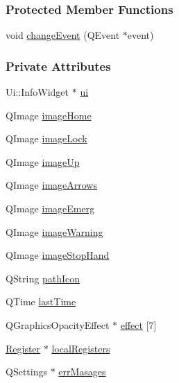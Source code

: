 \subsubsection*{Protected Member Functions}
\begin{DoxyCompactItemize}
\item 
void \mbox{\hyperlink{classInfoWidget_ab9215d8a0db2c91c669dba5e67e27f54}{change\+Event}} (Q\+Event $\ast$event)
\end{DoxyCompactItemize}
\subsubsection*{Private Attributes}
\begin{DoxyCompactItemize}
\item 
Ui\+::\+Info\+Widget $\ast$ \mbox{\hyperlink{classInfoWidget_aac7bf6194c8940ae8bfe6c58ac8a0a43}{ui}}
\item 
Q\+Image \mbox{\hyperlink{classInfoWidget_a0d4c516216ba3df3003c72eec8bf929b}{image\+Home}}
\item 
Q\+Image \mbox{\hyperlink{classInfoWidget_acc842dfe6d29575f2ddbd89cb48f3853}{image\+Lock}}
\item 
Q\+Image \mbox{\hyperlink{classInfoWidget_aff1ea16a7e3fffe12b6bf53ab8ab2df6}{image\+Up}}
\item 
Q\+Image \mbox{\hyperlink{classInfoWidget_a8958069e6c72dde19d74070b0b565d4c}{image\+Arrows}}
\item 
Q\+Image \mbox{\hyperlink{classInfoWidget_a6ca240f5f640fd0ea85e47e9e5d75803}{image\+Emerg}}
\item 
Q\+Image \mbox{\hyperlink{classInfoWidget_abaf1390d58dee5c66125dc58e2aee303}{image\+Warning}}
\item 
Q\+Image \mbox{\hyperlink{classInfoWidget_a0e0b5db9d429867826f370f2a24144da}{image\+Stop\+Hand}}
\item 
Q\+String \mbox{\hyperlink{classInfoWidget_ae0bf133d0a2f93b0536a47fcdad1fbe7}{path\+Icon}}
\item 
Q\+Time \mbox{\hyperlink{classInfoWidget_a2caf54e74e7a24fc5c51ba9c233bce2a}{last\+Time}}
\item 
Q\+Graphics\+Opacity\+Effect $\ast$ \mbox{\hyperlink{classInfoWidget_a08d17f18fb1e38dcf3fe8d8c4974dd22}{effect}} \mbox{[}7\mbox{]}
\item 
\mbox{\hyperlink{classRegister}{Register}} $\ast$ \mbox{\hyperlink{classInfoWidget_a410514814006364f1abb4ce70e15ea90}{local\+Registers}}
\item 
Q\+Settings $\ast$ \mbox{\hyperlink{classInfoWidget_a823b30e65e7e903ad07ae4decc13330d}{err\+Masages}}
\end{DoxyCompactItemize}


